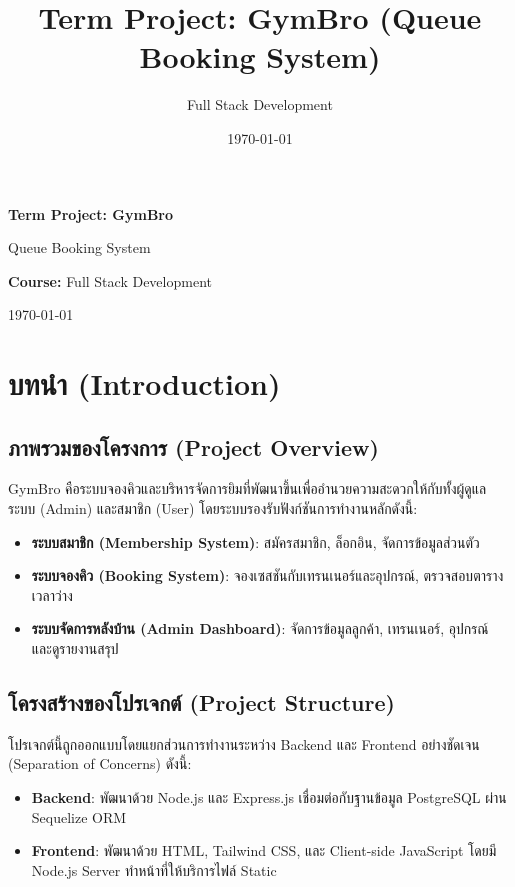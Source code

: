 \documentclass[12pt]{report}
\title{Term Project: GymBro (Queue Booking System)}
\author{Full Stack Development}
\date{\today}
\begin{document}
\begin{titlepage}
    \centering
    \vspace*{1cm}
    \Huge
    \textbf{Term Project: GymBro}
    
    \vspace{0.5cm}
    \LARGE
    Queue Booking System
    
    \vspace{1.5cm}
    \textbf{Course:} Full Stack Development
    
    \vfill
    \Large
    \today
    
\end{titlepage}

\tableofcontents
\newpage

\chapter{บทนำ (Introduction)}

\section{ภาพรวมของโครงการ (Project Overview)}
GymBro คือระบบจองคิวและบริหารจัดการยิมที่พัฒนาขึ้นเพื่ออำนวยความสะดวกให้กับทั้งผู้ดูแลระบบ (Admin) และสมาชิก (User) โดยระบบรองรับฟังก์ชันการทำงานหลักดังนี้:
\begin{itemize}
    \item \textbf{ระบบสมาชิก (Membership System)}: สมัครสมาชิก, ล็อกอิน, จัดการข้อมูลส่วนตัว
    \item \textbf{ระบบจองคิว (Booking System)}: จองเซสชันกับเทรนเนอร์และอุปกรณ์, ตรวจสอบตารางเวลาว่าง
    \item \textbf{ระบบจัดการหลังบ้าน (Admin Dashboard)}: จัดการข้อมูลลูกค้า, เทรนเนอร์, อุปกรณ์ และดูรายงานสรุป
\end{itemize}

\section{โครงสร้างของโปรเจกต์ (Project Structure)}
โปรเจกต์นี้ถูกออกแบบโดยแยกส่วนการทำงานระหว่าง Backend และ Frontend อย่างชัดเจน (Separation of Concerns) ดังนี้:

\begin{itemize}
    \item \textbf{Backend}: พัฒนาด้วย Node.js และ Express.js เชื่อมต่อกับฐานข้อมูล PostgreSQL ผ่าน Sequelize ORM
    \item \textbf{Frontend}: พัฒนาด้วย HTML, Tailwind CSS, และ Client-side JavaScript โดยมี Node.js Server ทำหน้าที่ให้บริการไฟล์ Static
\end{itemize}
\end{document}
